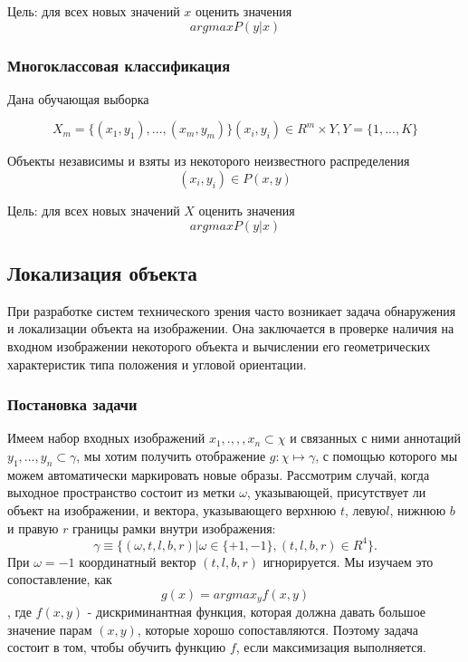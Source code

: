 Цель: для всех новых значений $ x$ оценить значения $$ argmaxP(y\vert x)$$ 

\subsubsection{Многоклассовая классификация}

Дана обучающая выборка 

$$ X_m=\lbrace(x_1,y_1),...,(x_m,y_m)\rbrace (x_i,y_i)\in R^m \times Y , Y=\lbrace 1,...,K \rbrace$$ 

Объекты независимы и взяты из некоторого неизвестного распределения 
$$ (x_i,y_i) \in P(x,y)$$ 

Цель: для всех новых значений $X$ оценить значения $$ argmaxP(y\vert x)$$ 







\subsection{Локализация объекта}
При разработке систем технического зрения часто возникает задача обнаружения и локализации объекта на изображении. Она заключается в проверке наличия на входном изображении некоторого объекта и вычислении его геометрических характеристик типа положения и угловой ориентации.

\subsubsection{Постановка задачи}

Имеем набор входных изображений ${x_1,. , , , x_n} \subset \chi $ и связанных с ними аннотаций ${y_1, ..., y_n} \subset \gamma $, мы хотим получить отображение $g: \chi \mapsto \gamma $, с помощью которого мы можем автоматически маркировать новые образы.
Рассмотрим случай, когда выходное пространство состоит из метки $ \omega $, указывающей, присутствует ли объект на изображении, и вектора, указывающего верхнюю $t$, левую$l$, нижнюю $b$  и правую $ r$ границы рамки внутри изображения: $$ \gamma \equiv \lbrace ( \omega , t, l, b, r) \vert ω ∈ \lbrace + 1, -1 \rbrace, (t, l, b, r) \in R^4 \rbrace .$$ При $ \omega = -1$ координатный вектор $(t, l, b, r)$ игнорируется. Мы изучаем это сопоставление,  как $$g(x) = argmax_y f (x, y)$$, где $f (x, y)$ - дискриминантная функция, которая должна давать большое значение парам $(x, y)$, которые хорошо сопоставляются. Поэтому задача состоит в том, чтобы обучить функцию $f$, если максимизация выполняется.










